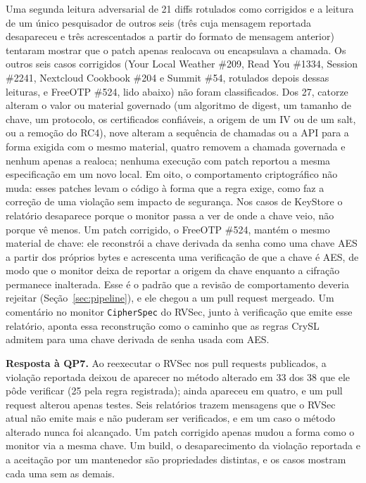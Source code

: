 \documentclass[conference]{IEEEtran}
\newcommand{\researchq}[1]{\textbf{QP#1}}
\begin{document}
Uma segunda leitura adversarial de 21 diffs rotulados como corrigidos e a
leitura de um único pesquisador de outros seis (três cuja mensagem reportada
desapareceu e três acrescentados a partir do formato de mensagem anterior)
tentaram mostrar que o patch apenas realocava ou encapsulava a chamada. Os
outros seis casos corrigidos (Your Local Weather \#209, Read You \#1334,
Session \#2241, Nextcloud Cookbook \#204 e Summit \#54, rotulados depois dessas
leituras, e FreeOTP \#524, lido abaixo) não foram classificados. Dos 27, catorze alteram o
valor ou material governado (um algoritmo de digest, um tamanho de chave, um protocolo, os certificados
confiáveis, a origem de um IV ou de um salt, ou a remoção do RC4), nove alteram a sequência de chamadas ou a API para a
forma exigida com o mesmo material, quatro removem a chamada governada e nenhum
apenas a realoca; nenhuma execução com patch reportou a mesma especificação em um novo
local. Em oito, o comportamento criptográfico não muda: esses patches levam o código à
forma que a regra exige, como faz a correção de uma violação sem impacto
de segurança. Nos casos de KeyStore o relatório desaparece porque o monitor
passa a ver de onde a chave veio, não porque vê menos. Um patch
corrigido, o FreeOTP \#524, mantém o mesmo material de chave: ele reconstrói a
chave derivada da senha como uma chave AES a partir dos próprios bytes e acrescenta uma verificação de que
a chave é AES, de modo que o monitor deixa de reportar a origem da chave enquanto a
cifração permanece inalterada. Esse é o padrão que a revisão de comportamento deveria
rejeitar (Seção~\ref{sec:pipeline}), e ele chegou a um pull request mergeado.
Um comentário no monitor \texttt{CipherSpec} do RVSec, junto à verificação que
emite esse relatório, aponta essa reconstrução como o caminho que as regras CrySL
admitem para uma chave derivada de senha usada com AES.

\textbf{Resposta à \researchq{7}.} Ao reexecutar o RVSec nos pull requests
publicados, a violação reportada deixou de aparecer no método alterado em
33 dos 38 que ele pôde verificar (25 pela regra registrada); ainda apareceu
em quatro, e um pull request
alterou apenas testes. Seis relatórios trazem mensagens que o RVSec atual não
emite mais e não puderam ser verificados, e em um caso o método alterado nunca foi
alcançado. Um patch corrigido apenas mudou a forma como o monitor via a mesma chave. Um build, o desaparecimento da violação reportada e a
aceitação por um mantenedor são propriedades distintas, e os casos mostram cada uma
sem as demais.
\end{document}
